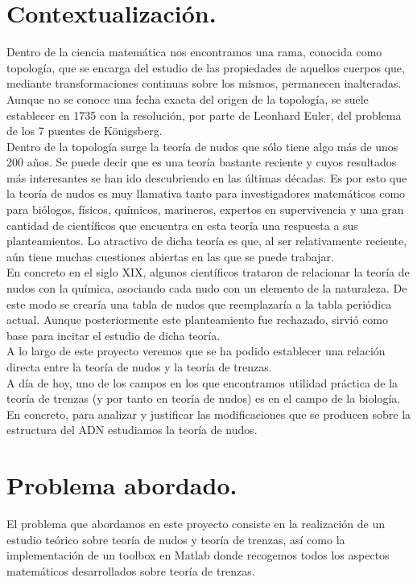 \section{Contextualización.}
Dentro de la ciencia matemática nos encontramos una rama, conocida como topología, que se encarga del estudio de las propiedades de aquellos cuerpos que, mediante transformaciones continuas sobre los mismos, permanecen inalteradas. Aunque no se conoce una fecha exacta del origen de la topología, se suele establecer en 1735 con la resolución, por parte de Leonhard Euler, del problema de los 7 puentes de Königsberg.\\

Dentro de la topología surge la teoría de nudos que sólo tiene algo más de unos 200 años. Se puede decir que es una teoría bastante reciente y cuyos resultados más interesantes se han ido descubriendo en las últimas décadas. Es por esto que la teoría de nudos es muy llamativa tanto para investigadores matemáticos como para biólogos, físicos, químicos, marineros, expertos en supervivencia y una gran cantidad de científicos que encuentra en esta teoría una respuesta a sus planteamientos. Lo atractivo de dicha teoría es que, al ser relativamente reciente, aún tiene muchas cuestiones abiertas en las que se puede trabajar. \\

En concreto en el siglo XIX, algunos científicos trataron de relacionar la teoría de nudos con la química, asociando cada nudo con un elemento de la naturaleza. De este modo se crearía una tabla de nudos que reemplazaría a la tabla periódica actual. Aunque posteriormente este planteamiento fue rechazado, sirvió como base para incitar el estudio de dicha teoría. \\

A lo largo de este proyecto veremos que se ha podido establecer una relación directa entre la teoría de nudos y la teoría de trenzas. \\

A día de hoy, uno de los campos en los que encontramos utilidad práctica de la teoría de trenzas (y por tanto en teoría de nudos) es en el campo de la biología. En concreto, para analizar y justificar las modificaciones que se producen sobre la estructura del ADN estudiamos la teoría de nudos. \\
 
\section{Problema abordado.}
El problema que abordamos en este proyecto consiste en la realización de un estudio teórico sobre teoría de nudos y teoría de trenzas, así como la implementación de un toolbox en Matlab donde recogemos todos los aspectos matemáticos desarrollados sobre teoría de trenzas. \\

